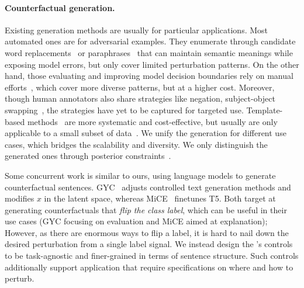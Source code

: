 \paragraph{Counterfactual generation.}
Existing generation methods are usually for particular applications.
Most automated ones are for adversarial examples. 
They enumerate through candidate word replacements~\cite{alzantot2018generating, garg2020bae} or paraphrases~\cite{iyyer2018adversarial, malandrakis-etal-2019-controlled} that can maintain semantic meanings while exposing model errors, but only cover limited perturbation patterns.
On the other hand, those evaluating and improving model decision boundaries rely on manual efforts~\cite{checklist:acl20}, which cover more diverse patterns, but at a higher cost.
Moreover, though human annotators also share strategies like negation, subject-object swapping~\cite{kaushik2019learning, gardner2020contrast}, the strategies have yet to be captured for targeted use.
Template-based methods~\cite{mccoy2019right, nie2019analyzing} are more systematic and cost-effective, but usually are only applicable to a small subset of data~\cite{li2020linguistically}.
We unify the generation for different use cases, which bridges the scalability and diversity.
We only distinguish the generated ones through posterior constraints~\cite{morris2020textattack, alzantot-etal-2018-generating}.

Some concurrent work is similar to ours, using language models to generate counterfactual sentences. 
GYC~\cite{madaan2020generate} adjusts controlled text generation methods and modifies $x$ in the latent space,  whereas MiCE~\cite{ross2020explaining} finetunes T5.
Both target at generating counterfactuals that \emph{flip the class label}, which can be useful in their use cases (GYC focusing on evaluation and MiCE aimed at explanation);
However, as there are enormous ways to flip a label, it is hard to nail down the desired perturbation from a single label signal.
We instead design the \sysname's controls to be task-agnostic and finer-grained in terms of sentence structure.
Such controls additionally support application that require specifications on where and how to perturb.





